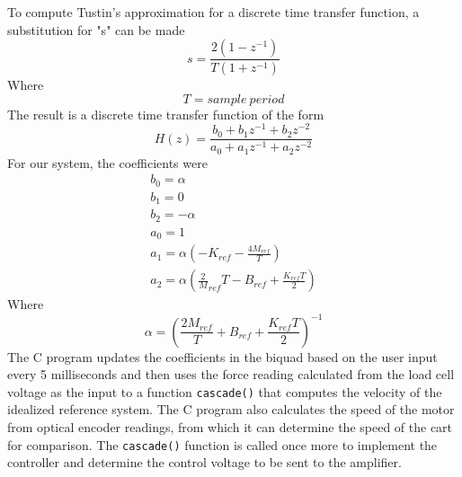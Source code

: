 To compute Tustin's approximation for a discrete time transfer function, a substitution for "s" can be made
\begin{equation}
s=\frac{2(1-z^{-1})}{T(1+z^{-1})}
\end{equation}
Where
\begin{equation}
T= sample\ period
\end{equation}
The result is a discrete time transfer function of the form
\begin{equation}
H(z)=\frac{b_{0}+b_{1}z^{-1}+b_{2}z^{-2}}{a_{0}+a_{1}z^{-1}+a_{2}z^{-2}}
\end{equation}
For our system, the coefficients were
\begin{eqnarray}
b_{0}=\alpha \\
b_{1}=0 \\
b_{2}=-\alpha \\
a_{0}=1 \\
a_{1}=\alpha(-K_{ref}-\frac{4M_{ref}}{T}) \\
a_{2}=\alpha(\frac2M_{ref}{T}-B_{ref}+\frac{K_{ref}T}{2})
\end{eqnarray}
Where
\begin{equation}
\alpha=(\frac{2M_{ref}}{T}+B_{ref}+\frac{K_{ref}T}{2})^{-1}
\end{equation}
The C program updates the coefficients in the biquad based on the user input every 5 milliseconds and then uses the force reading calculated from the load cell voltage as the input to a function \verb|cascade()| that computes the velocity of the idealized reference system. The C program also calculates the speed of the motor from optical encoder readings, from which it can determine the speed of the cart for comparison. The \verb|cascade()| function is called once more to implement the controller and determine the control voltage to be sent to the amplifier. 